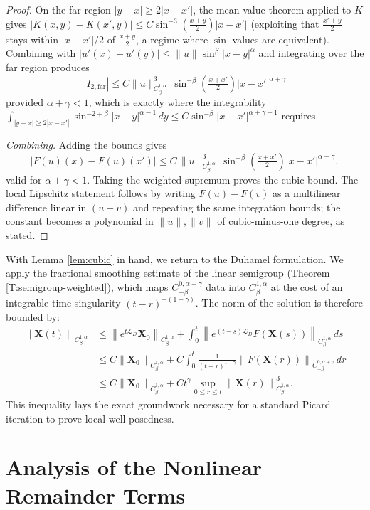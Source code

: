 \documentclass{amsart}
\newcommand{\mX}{\mathbf{X}}
\begin{document}
\begin{proof}
On the far region $|y-x|\ge 2|x-x'|$, the mean value theorem applied to $K$ gives $|K(x,y)-K(x',y)|\le C\sin^{-3}(\frac{x+y}{2})|x-x'|$ (exploiting that $\frac{x'+y}{2}$ stays within $|x-x'|/2$ of $\frac{x+y}{2}$, a regime where $\sin$ values are equivalent). Combining with $|u'(x)-u'(y)|\le\|u\|\sin^\beta|x-y|^\alpha$ and integrating over the far region produces
\[
|I_{2,\mathrm{far}}|\le C\|u\|_{C^{1,\alpha}_\beta}^3\,\sin^{-\beta}\!\left(\tfrac{x+x'}{2}\right)|x-x'|^{\alpha+\gamma}
\]
provided $\alpha+\gamma<1$, which is exactly where the integrability $\int_{|y-x|\ge 2|x-x'|}\sin^{-2+\beta}|x-y|^{\alpha-1}\,dy\le C\sin^{-\beta}|x-x'|^{\alpha+\gamma-1}$ requires.

\emph{Combining.} Adding the bounds gives
\[
|F(u)(x)-F(u)(x')|
\le
C\,\|u\|_{C^{1,\alpha}_\beta}^3\,\sin^{-\beta}\!\left(\tfrac{x+x'}{2}\right)
|x-x'|^{\alpha+\gamma},
\]
valid for $\alpha+\gamma<1$. Taking the weighted supremum proves the cubic bound. The local Lipschitz statement follows by writing $F(u)-F(v)$ as a multilinear difference linear in $(u-v)$ and repeating the same integration bounds; the constant becomes a polynomial in $\|u\|,\|v\|$ of cubic-minus-one degree, as stated.
\end{proof}

With Lemma \ref{lem:cubic} in hand, we return to the Duhamel formulation.  We apply the fractional smoothing estimate of the linear semigroup (Theorem \ref{T:semigroup-weighted}), which maps $C^{0,\alpha+\gamma}_{-\beta}$ data into $C^{1,\alpha}_\beta$ at the cost of an integrable time singularity $(t-r)^{-(1-\gamma)}$. The norm of the solution is therefore bounded by:
\begin{align*}
\left\| \mX(t) \right\|_{C^{1,\alpha}_{\beta}}
& \leq \left\| e^{t \mathcal{L}_D} \mX_0 \right\|_{C^{1,\alpha}_{\beta}}
+ \int_0^t \left\| e^{(t-s) \mathcal{L}_D} F(\mX(s)) \right\|_{C^{1,\alpha}_{\beta}} \,ds\\
& \leq C \left\| \mX_0 \right\|_{C^{1,\alpha}_{\beta}}
+ C \int_0^t \frac{1}{(t-r)^{1-\gamma}} \left\| F(\mX(r)) \right\|_{C^{0,\alpha+\gamma}_{-\beta}} \,dr \\
& \leq C \left\| \mX_0 \right\|_{C^{1,\alpha}_{\beta}}
+ C t^\gamma \sup_{0\leq r \leq t} \left\| \mX(r) \right\|^3_{C^{1,\alpha}_{\beta}}.
\end{align*}
This inequality lays the exact groundwork necessary for a standard Picard iteration to prove local well-posedness.

\section{Analysis of the Nonlinear Remainder Terms}
\end{document}
